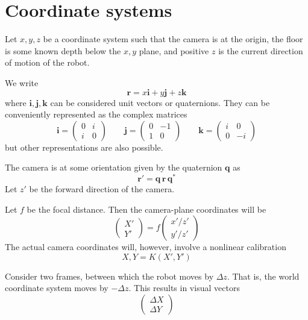 \documentclass{article}
\def\r{\mathbf{r}}
\def\q{\mathbf{q}}
\def\i{\mathbf{i}}
\def\j{\mathbf{j}}
\def\k{\mathbf{k}}
\begin{document}
\section{Coordinate systems}

Let $x,y,z$ be a coordinate system such that the camera is at the
origin, the floor is some known depth below the $x,y$ plane, and
positive $z$ is the current direction of motion of the robot.

We write
\begin{equation}
  \r = x\i + y\j + z\k
\end{equation}
where $\i,\j,\k$ can be considered unit vectors or quaternions.  They
can be conveniently represented as the complex matrices
\begin{equation}
\i = \begin{pmatrix} 0 & i  \\ i & 0  \end{pmatrix} \qquad
\j = \begin{pmatrix} 0 & -1 \\ 1 & 0  \end{pmatrix} \qquad
\k = \begin{pmatrix} i & 0  \\ 0 & -i \end{pmatrix}
\end{equation}
but other representations are also possible.

The camera is at some orientation given by the quaternion $\q$ as
\begin{equation}
\r' = \q \, \r \, \q^*
\end{equation}
Let $z'$ be the forward direction of the camera.

Let $f$ be the focal distance.  Then the camera-plane coordinates will
be
\begin{equation}
  \begin{pmatrix} X' \\ Y' \end{pmatrix} =
  f \begin{pmatrix} x'/z' \\ y'/z' \end{pmatrix}
\end{equation}
The actual camera coordinates will, however, involve a nonlinear
calibration
\begin{equation}
  X,Y = K(X',Y')
\end{equation}

Consider two frames, between which the robot moves by $\Delta z$.
That is, the world coordinate system moves by $-\Delta z$.  This
results in visual vectors
\begin{equation}
  \begin{pmatrix} \Delta X \\ \Delta Y \end{pmatrix}
\end{equation}
\end{document}
